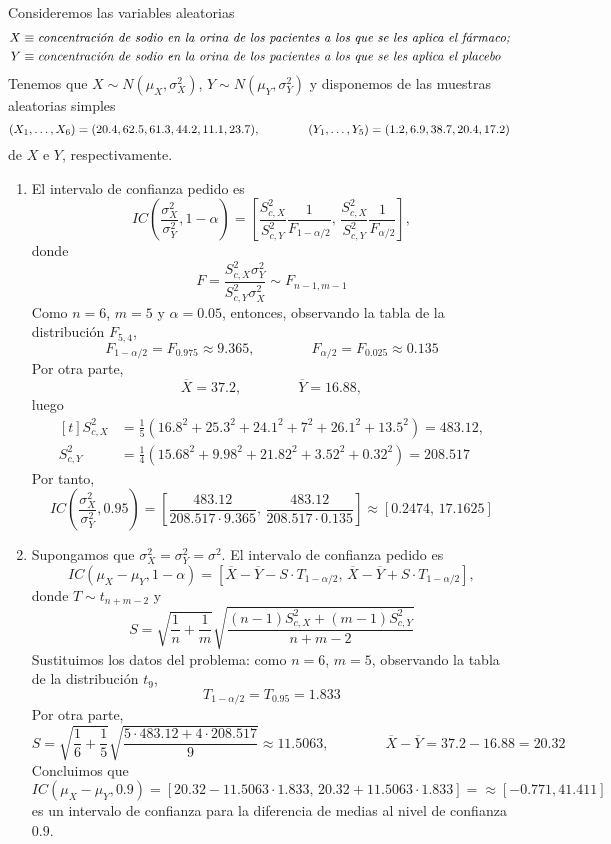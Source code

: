 \documentclass[11pt]{report}
\makeatletter
\renewenvironment{proof}[1][\proofname]{\par
  \pushQED{\qed}%
  \normalfont \topsep\z@skip %
  \trivlist
  \item[\hskip\labelsep
        \itshape
    #1\@addpunct{.}]\ignorespaces
}{%
  \popQED\endtrivlist\@endpefalse
}
\makeatother
\begin{document}
\begin{proof}
  Consideremos las variables aleatorias
  \[\begin{aligned}[t]
    X &\equiv \textup{\emph{concentración de sodio en la orina de los pacientes a los que se les aplica el fármaco;}} \\
    Y &\equiv \textup{\emph{concentración de sodio en la orina de los pacientes a los que se les aplica el placebo}}
  \end{aligned}\]
  Tenemos que $X \sim N(\mu_X,\sigma_X^2)$, $Y \sim N(\mu_Y, \sigma_Y^2)$ y disponemos de las muestras aleatorias simples 
  \[(X_1,\mathellipsis,X_6) = (20.4, 62.5, 61.3, 44.2, 11.1, 23.7), \qquad \qquad (Y_1,\mathellipsis,Y_5) = (1.2, 6.9, 38.7, 20.4, 17.2)\]
  de $X$ e $Y$, respectivamente.

  \begin{enumerate}
    \item El intervalo de confianza pedido es
    \[IC\left(\frac{\sigma_X^2}{\sigma_Y^2}, 1-\alpha\right) = \left[\frac{S^2_{c,X}}{S^2_{c,Y}}\frac{1}{F_{1-\alpha/2}}, \, \frac{S^2_{c,X}}{S^2_{c,Y}}\frac{1}{F_{\alpha/2}}\right],\]
    donde
    \[F = \frac{S^2_{c,X}\sigma^2_Y}{S^2_{c,Y}\sigma^2_X} \sim F_{n-1,m-1}\]
    Como $n = 6$, $m = 5$ y $\alpha = 0.05$, entonces, observando la tabla de la distribución $F_{5,4}$,  
    \[F_{1-\alpha/2} = F_{0.975} \approx 9.365, \qquad \qquad F_{\alpha/2} = F_{0.025} \approx 0.135\]
    Por otra parte, 
    \[\overline{X} = 37.2, \qquad \qquad \overline{Y} = 16.88,\]
    luego
    \[
    \begin{aligned}[t]  
    S^2_{c,X} &= \frac{1}{5}\left(16.8^2+25.3^2+24.1^2+7^2+26.1^2+13.5^2\right)  =483.12, \\
    S^2_{c,Y} &= \frac{1}{4}\left(15.68^2+9.98^2+21.82^2+3.52^2+0.32^2\right) = 208.517
    \end{aligned}
    \]
    Por tanto,
    \[IC\left(\frac{\sigma_X^2}{\sigma_Y^2}, 0.95\right) = \left[\frac{483.12}{208.517 \cdot 9.365} , \, \frac{483.12}{208.517 \cdot 0.135} \right] \approx \left[0.2474, \, 17.1625\right]\]
    \item Supongamos que $\sigma^2_X = \sigma^2_Y=\sigma^2$. El intervalo de confianza pedido es
    \[IC\left(\mu_X-\mu_Y,1-\alpha\right) = \left[\overline{X}-\overline{Y}-S \cdot T_{1-\alpha/2}, \, \overline{X}-\overline{Y}+S \cdot T_{1-\alpha/2}\right],\]
    donde $T \sim t_{n+m-2}$ y
    \[S = \sqrt{\frac{1}{n}+\frac{1}{m}} \sqrt{\frac{(n-1)S^2_{c,X}+(m-1)S^2_{c,Y}}{n+m-2}}\]
    Sustituimos los datos del problema: como $n=6$, $m=5$, observando la tabla de la distribución $t_{9}$,
    \[T_{1-\alpha/2} = T_{0.95} = 1.833\]
    Por otra parte,
    \[S = \sqrt{\frac{1}{6}+\frac{1}{5}} \sqrt{\frac{5\cdot 483.12+4 \cdot208.517}{9}} \approx 11.5063, \qquad \qquad \overline{X}-\overline{Y} = 37.2-16.88 = 20.32\]
    Concluimos que
    \[IC\left(\mu_X-\mu_Y,0.9\right) = \left[20.32-11.5063 \cdot 1.833,\, 20.32+11.5063 \cdot 1.833\right] = \approx \left[-0.771, 41.411\right]\]
    es un intervalo de confianza para la diferencia de medias al nivel de confianza $0.9$. \qedhere
  \end{enumerate}
\end{proof}
\end{document}
